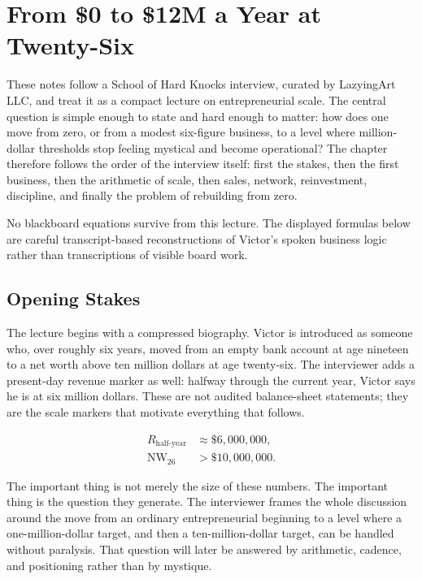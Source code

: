 \chapter{From \$0 to \$12M a Year at Twenty-Six}

These notes follow a School of Hard Knocks interview, curated by LazyingArt LLC, and treat it as a compact lecture on entrepreneurial scale. The central question is simple enough to state and hard enough to matter: how does one move from zero, or from a modest six-figure business, to a level where million-dollar thresholds stop feeling mystical and become operational? The chapter therefore follows the order of the interview itself: first the stakes, then the first business, then the arithmetic of scale, then sales, network, reinvestment, discipline, and finally the problem of rebuilding from zero.

\begin{remark}
No blackboard equations survive from this lecture. The displayed formulas below are careful transcript-based reconstructions of Victor's spoken business logic rather than transcriptions of visible board work.
\end{remark}

\section{Opening Stakes}

The lecture begins with a compressed biography. Victor is introduced as someone who, over roughly six years, moved from an empty bank account at age nineteen to a net worth above ten million dollars at age twenty-six. The interviewer adds a present-day revenue marker as well: halfway through the current year, Victor says he is at six million dollars. These are not audited balance-sheet statements; they are the scale markers that motivate everything that follows.

\begin{align}
R_{\text{half-year}} &\approx \$6{,}000{,}000, \\
\mathrm{NW}_{26} &> \$10{,}000{,}000.
\end{align}

The important thing is not merely the size of these numbers. The important thing is the question they generate. The interviewer frames the whole discussion around the move from an ordinary entrepreneurial beginning to a level where a one-million-dollar target, and then a ten-million-dollar target, can be handled without paralysis. That question will later be answered by arithmetic, cadence, and positioning rather than by mystique.

